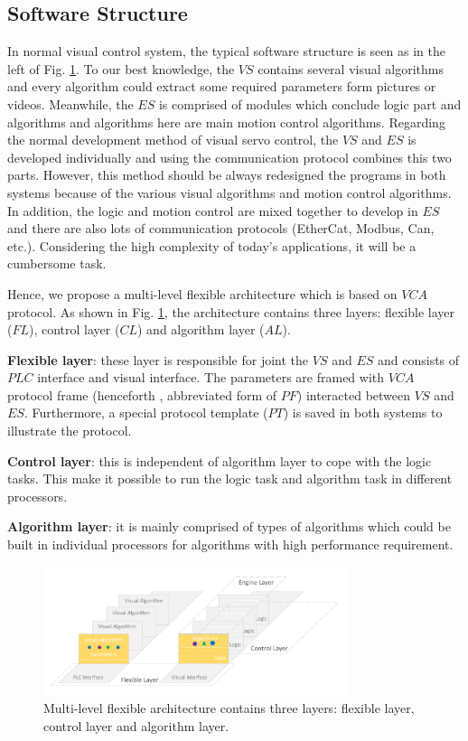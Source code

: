 \documentclass[journal,UTF8]{IEEEtran}
\begin{document}
\subsection{Software Structure}
In normal visual control system, the typical software structure is seen as in the left of Fig. \ref{fig:Software}.
To our best knowledge, the $VS$ contains several visual algorithms and every algorithm could extract some required parameters form pictures or videos. Meanwhile, the $ES$ is comprised of modules which conclude logic part and algorithms and algorithms here are main motion control algorithms. Regarding the normal development method of visual servo control, the $VS$ and $ES$ is developed individually and using the communication protocol combines this two parts. However, this method should be always redesigned the programs in both systems because of the various visual algorithms and motion control algorithms. In addition, the logic and motion control are mixed together to develop in $ES$ and there are also lots of communication protocols (EtherCat, Modbus, Can, etc.). Considering the high complexity of today’s applications, it will be a cumbersome task.

Hence, we propose a multi-level flexible architecture which is based on $VCA$ protocol. As shown in Fig. \ref{fig:Software}, the architecture contains three layers: flexible layer ($FL$), control layer ($CL$) and algorithm layer ($AL$).

\textbf{Flexible layer}: these layer is responsible for joint the $VS$ and $ES$ and consists of $PLC$ interface and visual interface. The parameters are framed with $VCA$ protocol frame (henceforth
, abbreviated form of $PF$) interacted between $VS$ and $ES$. Furthermore, a special protocol template ($PT$) is saved in both systems to illustrate the protocol.

\textbf{Control layer}: this is independent of algorithm layer to cope with the logic tasks. This make it possible to run the logic task and algorithm task in different processors.

\textbf{Algorithm layer}: it is mainly comprised of types of algorithms which could be built in individual processors for algorithms with high performance requirement. 


\begin{figure}
	\centering
	\includegraphics[width=3.5in]{fig/Software.pdf}
	\caption{Multi-level flexible architecture contains three layers: flexible layer, control layer and algorithm layer.}
	\label{fig:Software}
\end{figure}
\end{document}
